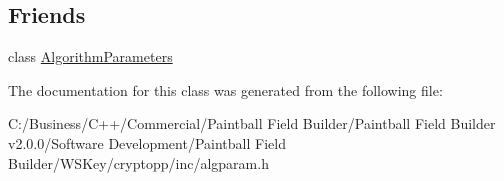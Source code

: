 \subsection*{Friends}
\begin{DoxyCompactItemize}
\item 
\hypertarget{class_algorithm_parameters_base_a50218785b7e73a705f82f797db13a3fb}{
class \hyperlink{class_algorithm_parameters_base_a50218785b7e73a705f82f797db13a3fb}{AlgorithmParameters}}
\label{class_algorithm_parameters_base_a50218785b7e73a705f82f797db13a3fb}

\end{DoxyCompactItemize}


The documentation for this class was generated from the following file:\begin{DoxyCompactItemize}
\item 
C:/Business/C++/Commercial/Paintball Field Builder/Paintball Field Builder v2.0.0/Software Development/Paintball Field Builder/WSKey/cryptopp/inc/algparam.h\end{DoxyCompactItemize}
